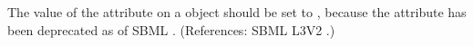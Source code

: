 The value of the attribute  on a \Reaction object should be
set to , because the  attribute has been deprecated as of SBML \thisLV.  (References: SBML L3V2
.)
